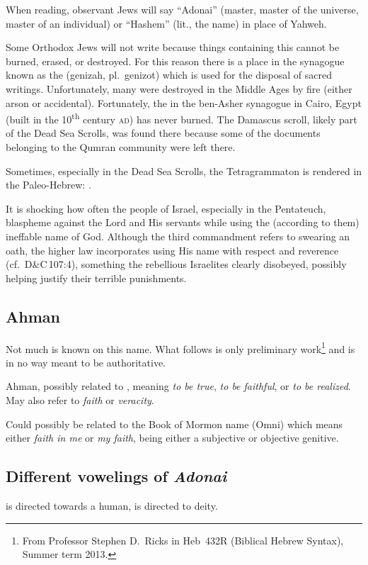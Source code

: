 When reading, observant Jews will say ``Adonai'' (master, master of the universe, master of an individual) or ``Hashem'' (lit., the name) in place of Yahweh.

Some Orthodox Jews will not write  because things containing this cannot be burned, erased, or destroyed. For this reason there is a place in the synagogue known as the  (genizah, pl.\ genizot) which is used for the disposal of sacred writings. Unfortunately, many  were destroyed in the Middle Ages by fire (either arson or accidental). Fortunately, the  in the ben-Asher synagogue in Cairo, Egypt (built in the 10\textsuperscript{th} century \textsc{ad}) has never burned. The Damascus scroll, likely part of the Dead Sea Scrolls, was found there because some of the documents belonging to the Qumran community were left there.

Sometimes, especially in the Dead Sea Scrolls, the Tetragrammaton is rendered in the Paleo-Hebrew: .

It is shocking how often the people of Israel, especially in the Pentateuch, blaspheme against the Lord and His servants while using the (according to them) ineffable name of God. Although the third commandment refers to swearing an oath, the higher law incorporates using His name with respect and reverence (cf.~D\&C\,107:4), something the rebellious Israelites clearly disobeyed, possibly helping justify their terrible punishments.

\subsection{Ahman}
Not much is known on this name. What follows is only preliminary work\footnote{From Professor Stephen D.\ Ricks in Heb~432R (Biblical Hebrew Syntax), Summer term 2013.} and is in no way meant to be authoritative.

Ahman, possibly related to , meaning \emph{to be true}, \emph{to be faithful}, or \emph{to be realized}. May also refer to \emph{faith} or \emph{veracity}.

Could possibly be related to the Book of Mormon name  (Omni) which means either \emph{faith in me} or \emph{my faith},  being either a subjective or objective genitive.

\subsection{Different vowelings of \textit{Adonai}}\label{app:adonai}
 is directed towards a human,  is directed to deity.
